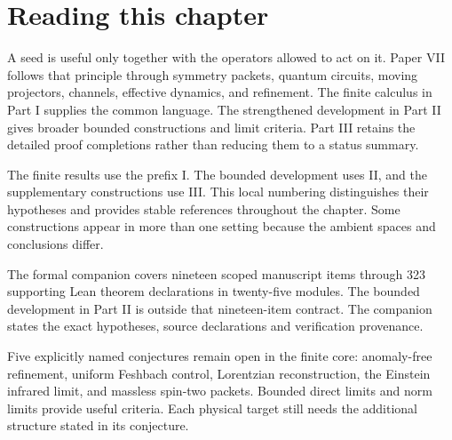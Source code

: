 \documentclass[11pt,letterpaper]{article}
\theoremstyle{definition}
\theoremstyle{remark}
\begin{document}
\KomorebiCover
\begingroup
\setlength{\parskip}{3pt plus .5pt minus .5pt}

\section*{Reading this chapter}
A seed is useful only together with the operators allowed to act on it. Paper VII follows that principle through symmetry packets, quantum circuits, moving projectors, channels, effective dynamics, and refinement. The finite calculus in Part I supplies the common language. The strengthened development in Part II gives broader bounded constructions and limit criteria. Part III retains the detailed proof completions rather than reducing them to a status summary.

The finite results use the prefix I. The bounded development uses II, and the supplementary constructions use III. This local numbering distinguishes their hypotheses and provides stable references throughout the chapter. Some constructions appear in more than one setting because the ambient spaces and conclusions differ.

The formal companion covers nineteen scoped manuscript items through 323 supporting Lean theorem declarations in twenty-five modules. The bounded development in Part II is outside that nineteen-item contract. The companion states the exact hypotheses, source declarations and verification provenance.

Five explicitly named conjectures remain open in the finite core: anomaly-free refinement, uniform Feshbach control, Lorentzian reconstruction, the Einstein infrared limit, and massless spin-two packets. Bounded direct limits and norm limits provide useful criteria. Each physical target still needs the additional structure stated in its conjecture.
\end{document}
